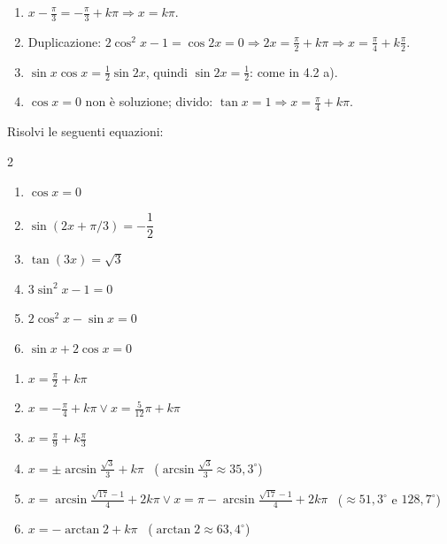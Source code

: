 \begin{question}[ID=4.4, subtitle={Equazioni goniometriche con duplicazione — serie 4}, tags={goniometria, equazioni goniometriche}, difficulty=media]
\begin{explanation}
\begin{enumerate}
\[\begin{aligned}
    \end{aligned}\]
    \item $x-\tfrac\pi3=-\tfrac\pi3+k\pi \Rightarrow x=k\pi$.
    \item Duplicazione: $2\cos^2x-1=\cos2x=0 \Rightarrow 2x=\tfrac\pi2+k\pi \Rightarrow x=\tfrac\pi4+k\tfrac\pi2$.
    \item $\sin x\cos x=\tfrac12\sin2x$, quindi $\sin2x=\tfrac12$: come in 4.2 a).
    \item $\cos x=0$ non è soluzione; divido: $\tan x=1 \Rightarrow x=\tfrac\pi4+k\pi$.
\end{enumerate}
\end{explanation}
\end{question}


\begin{question}[ID=4.5, subtitle={Equazioni goniometriche miste — serie 5}, tags={goniometria, equazioni goniometriche}, difficulty=media]
Risolvi le seguenti equazioni:
\begin{multicols}{2}
\begin{enumerate}
\item $\cos x = 0$
\item $\sin(2x + \pi/3) = -\dfrac{1}{2}$
\item $\tan(3x) = \sqrt{3}$
\item $3 \sin^2 x - 1 = 0$
\item $2 \cos^2 x - \sin x = 0$
\item $\sin x + 2 \cos x = 0$
\end{enumerate}
\end{multicols}
\begin{solution}
\begin{enumerate}
    \item $x=\tfrac\pi2+k\pi$
    \item $x=-\tfrac\pi4+k\pi \vee x=\tfrac5{12}\pi+k\pi$
    \item $x=\tfrac\pi9+k\tfrac\pi3$
    \item $x=\pm\arcsin\tfrac{\sqrt3}{3}+k\pi$ \ ($\arcsin\tfrac{\sqrt3}{3}\approx35{,}3^\circ$)
    \item $x=\arcsin\tfrac{\sqrt{17}-1}{4}+2k\pi \vee x=\pi-\arcsin\tfrac{\sqrt{17}-1}{4}+2k\pi$ \ ($\approx51{,}3^\circ$ e $128{,}7^\circ$)
    \item $x=-\arctan2+k\pi$ \ ($\arctan2\approx63{,}4^\circ$)
\end{enumerate}
\end{solution}

\end{question}

